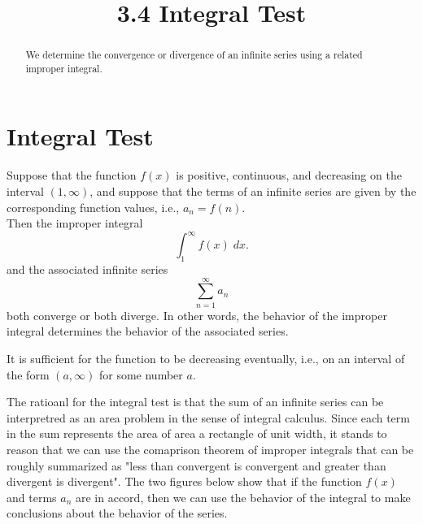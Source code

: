 \documentclass{ximera}
\title{3.4 Integral Test}
\begin{document}
\begin{abstract}
We determine the convergence or divergence of an infinite series using a related improper integral.
\end{abstract}

\maketitle

\section{Integral Test}

\begin{theorem}
Suppose that the function $f(x)$ is positive, continuous, and decreasing on the interval $(1, \infty)$, and 
suppose that the terms of an infinite series
are given by the corresponding function values, i.e., $a_n = f(n)$. \\
Then the improper integral
\[
\int_1^\infty f(x) \; dx.
\]
and the associated infinite series
\[
\sum_{n=1}^\infty a_n
\]
both converge or both diverge. In other words, the behavior of the improper integral 
determines the behavior of the associated series.
\end{theorem}

\begin{remark}
It is sufficient for the function to be decreasing eventually, i.e., on an interval of the form $(a, \infty)$
for some number $a$.
\end{remark}


The ratioanl for the integral test is that the sum of an infinite series can be interpretred as an area problem in the sense of integral calculus.
Since each term in the sum represents the area of area a rectangle of unit width, 
it stands to reason that we can use the comaprison theorem of improper integrals that can be roughly 
summarized as "less than convergent is convergent and greater than divergent is divergent". The two figures below show that if 
the function $f(x)$ and terms $a_n$ are in accord, then we can use the behavior of the integral to make conclusions about the behavior of the series.
\end{document}
